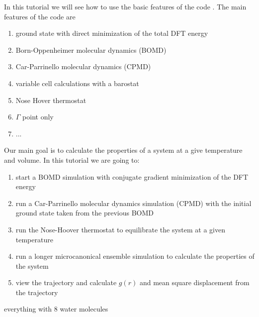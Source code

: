 \documentclass[landscape]{foils}
\begin{document}
In this tutorial we will see how to use the basic features of the code . The main features of the code are
\begin{enumerate}
\item ground state with direct minimization of the total DFT energy
\item Born-Oppenheimer molecular dynamics (BOMD)
\item Car-Parrinello molecular dynamics (CPMD)
\item variable cell calculations with a barostat
\item Nose Hover thermostat
\item $\Gamma$ point only
\item ...
\end{enumerate}
Our main goal is to calculate the properties of a system at a give temperature and volume. In this tutorial we are going to:
\begin{enumerate}
\item start a BOMD simulation with conjugate gradient minimization of the DFT energy
\item run a Car-Parrinello molecular dynamics simulation (CPMD) with the initial ground state taken from the previous BOMD
\item run the Nose-Hoover thermostat to equilibrate the system at a given temperature
\item run a longer microcanonical ensemble simulation to calculate the properties of the system
\item view the trajectory and calculate $g(r)$ and mean square displacement from the trajectory
\end{enumerate}
everything with 8 water molecules
\end{document}
